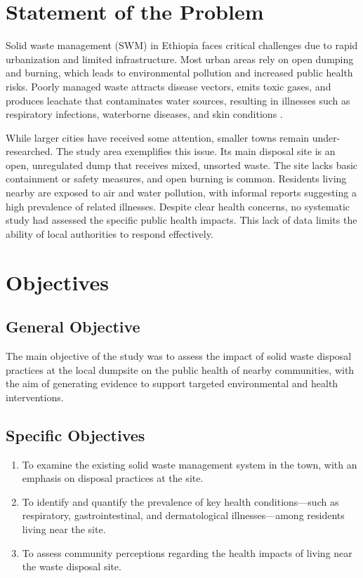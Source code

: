 \section{Statement of the Problem}
Solid waste management (SWM) in Ethiopia faces critical challenges due to rapid urbanization and limited infrastructure. Most urban areas rely on open dumping and burning, which leads to environmental pollution and increased public health risks. Poorly managed waste attracts disease vectors, emits toxic gases, and produces leachate that contaminates water sources, resulting in illnesses such as respiratory infections, waterborne diseases, and skin conditions \cite{MoUDC2017, WHO2018}.

While larger cities have received some attention, smaller towns remain under-researched. The study area exemplifies this issue. Its main disposal site is an open, unregulated dump that receives mixed, unsorted waste. The site lacks basic containment or safety measures, and open burning is common. Residents living nearby are exposed to air and water pollution, with informal reports suggesting a high prevalence of related illnesses. Despite clear health concerns, no systematic study had assessed the specific public health impacts. This lack of data limits the ability of local authorities to respond effectively.

\section{Objectives}
\subsection{General Objective}
The main objective of the study was to assess the impact of solid waste disposal practices at the local dumpsite on the public health of nearby communities, with the aim of generating evidence to support targeted environmental and health interventions.

\subsection{Specific Objectives}
\begin{enumerate}
    \item To examine the existing solid waste management system in the town, with an emphasis on disposal practices at the site.
    \item To identify and quantify the prevalence of key health conditions—such as respiratory, gastrointestinal, and dermatological illnesses—among residents living near the site.
    \item To assess community perceptions regarding the health impacts of living near the waste disposal site.
\end{enumerate}


